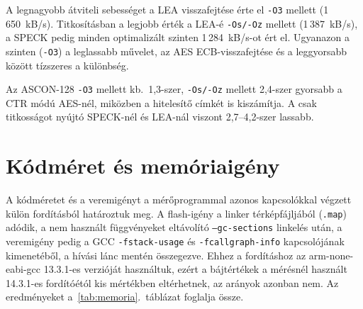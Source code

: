 \documentclass[a4paper,12pt]{report}
\theoremstyle{definition}
\theoremstyle{remark}
\begin{document}
A legnagyobb átviteli sebességet a LEA visszafejtése érte el \texttt{-O3} mellett (1\,650~kB/s). Titkosításban a legjobb érték a LEA-é \texttt{-Os/-Oz} mellett (1\,387~kB/s), a SPECK pedig minden optimalizált szinten 1\,284~kB/s-ot ért el. Ugyanazon a szinten (\texttt{-O3}) a leglassabb művelet, az AES ECB-visszafejtése és a leggyorsabb között tízszeres a különbség.

Az ASCON-128 \texttt{-O3} mellett kb.\ 1,3-szer, \texttt{-Os/-Oz} mellett 2,4-szer gyorsabb a CTR módú AES-nél, miközben a hitelesítő címkét is kiszámítja. A csak titkosságot nyújtó SPECK-nél és LEA-nál viszont 2,7--4,2-szer lassabb.

\section{Kódméret és memóriaigény}\label{sec:memoria}

A kódméretet és a veremigényt a mérőprogrammal azonos kapcsolókkal végzett külön fordításból határoztuk meg. A flash-igény a linker térképfájljából (\texttt{.map}) adódik, a nem használt függvényeket eltávolító \texttt{--gc-sections} linkelés után, a veremigény pedig a GCC \texttt{-fstack-usage} és \texttt{-fcallgraph-info} kapcsolójának kimenetéből, a hívási lánc mentén összegezve. Ehhez a fordításhoz az arm-none-eabi-gcc 13.3.1-es verzióját használtuk, ezért a bájtértékek a mérésnél használt 14.3.1-es fordítóétól kis mértékben eltérhetnek, az arányok azonban nem. %
Az eredményeket a~\ref{tab:memoria}.~táblázat foglalja össze.
\end{document}
